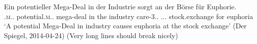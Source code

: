 \ea
\gll Ein potentieller Mega-Deal in der Industrie sorgt an der B{\"o}rse f{\"u}r Euphorie.\\
        \INDF.\textsc{m}.\SG.\NOM{} potential.\textsc{m}.\SG.\NOM{} mega-deal in the industry care-3\SG.\PRS.\IND{} \LOC{} \DEF.\F.\SG.\DAT{} stock.exchange for euphoria\\
\glt `A potential Mega-Deal in industry causes euphoria at the stock exchange' (Der Spiegel, 2014-04-24) (Very long lines should break nicely)
\z
